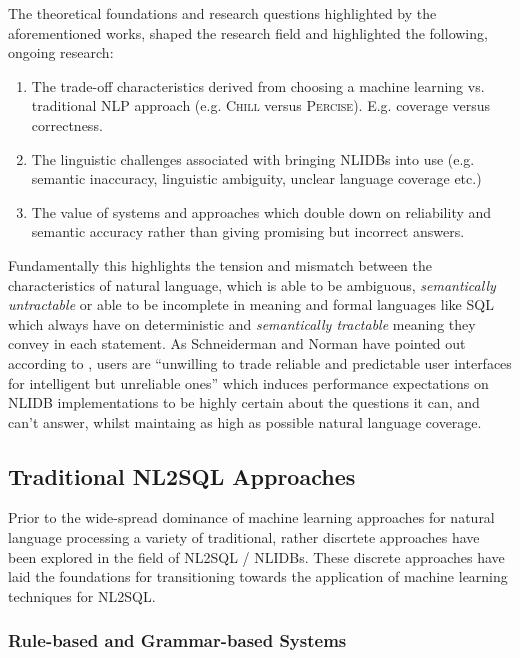 \documentclass{article}
\begin{document}
The theoretical foundations and research questions highlighted by the aforementioned works, shaped the research
field and highlighted the following, ongoing research:

\begin{enumerate}
    \item The trade-off characteristics derived from choosing a machine learning vs. traditional NLP approach (e.g. 
          \textsc{Chill} versus \textsc{Percise}). E.g. coverage versus correctness. \citep{ILPParsing, NLIDBTheory}
    \item The linguistic challenges associated with bringing NLIDBs into use (e.g. semantic inaccuracy, linguistic 
          ambiguity, unclear language coverage etc.) \citep{NLIDBs}
    \item The value of systems and approaches which double down on reliability and semantic accuracy rather than giving
          promising but incorrect answers. \citep{NLIDBs, NLIDBTheory}
\end{enumerate}

Fundamentally this highlights the tension and mismatch between the characteristics of natural language, which is 
able to be ambiguous, \textit{semantically untractable} or able to be incomplete in meaning and formal languages
like SQL which always have on deterministic and \textit{semantically tractable} meaning they convey in each statement. 
As Schneiderman and Norman have pointed out according to \citeauthor*{NLIDBTheory}, users are ``unwilling to trade 
reliable and predictable user interfaces for intelligent but unreliable ones'' which induces performance expectations
on NLIDB implementations to be highly certain about the questions it can, and can't answer, whilst maintaing as high
as possible natural language coverage. \citep{NLIDBTheory}

\subsection{Traditional NL2SQL Approaches}

Prior to the wide-spread dominance of machine learning approaches for natural language processing a variety of
traditional, rather discrtete approaches have been explored in the field of NL2SQL / NLIDBs. These discrete
approaches have laid the foundations for transitioning towards the application of machine learning techniques
for NL2SQL.

\subsubsection{Rule-based and Grammar-based Systems}
\end{document}
